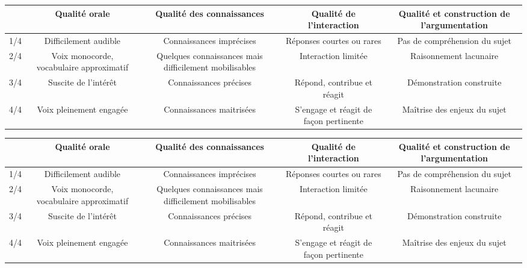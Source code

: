 \nomPrenomClasse
\begin{center}
    \begin{tabular}{|C{0.07}|C{0.2}|C{0.2}|C{0.2}|C{0.2}|}
        \hline
        & Qualité orale & Qualité des connaissances & Qualité de l'interaction & Qualité et construction de l'argumentation \\
        \hline
        1/4 & Difficilement audible & Connaissances imprécises & Réponses courtes ou rares & Pas de compréhension du sujet \\
        \hline 
        2/4 & Voix monocorde, vocabulaire approximatif & Quelques connaissances mais difficilement mobilisables & Interaction limitée & Raisonnement lacunaire \\ 
        \hline
        3/4 & Suscite de l'intérêt & Connaissances précises & Répond, contribue et réagit & Démonstration construite \\ 
        \hline
        4/4 & Voix pleinement engagée & Connaissances maitrisées & S'engage et réagit de façon pertinente & Maîtrise des enjeux du sujet \\
        \hline
    \end{tabular}
\end{center}
\vspace{1cm}

\nomPrenomClasse
\begin{center}
    \begin{tabular}{|C{0.07}|C{0.2}|C{0.2}|C{0.2}|C{0.2}|}
        \hline
        & Qualité orale & Qualité des connaissances & Qualité de l'interaction & Qualité et construction de l'argumentation \\
        \hline
        1/4 & Difficilement audible & Connaissances imprécises & Réponses courtes ou rares & Pas de compréhension du sujet \\
        \hline 
        2/4 & Voix monocorde, vocabulaire approximatif & Quelques connaissances mais difficilement mobilisables & Interaction limitée & Raisonnement lacunaire \\ 
        \hline
        3/4 & Suscite de l'intérêt & Connaissances précises & Répond, contribue et réagit & Démonstration construite \\ 
        \hline
        4/4 & Voix pleinement engagée & Connaissances maitrisées & S'engage et réagit de façon pertinente & Maîtrise des enjeux du sujet \\
        \hline
    \end{tabular}
\end{center}
\newpage

